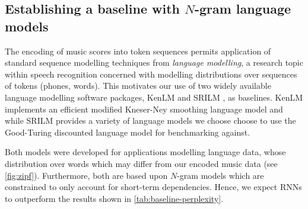 \subsection{Establishing a baseline with $N$-gram language models}

The encoding of music scores into token sequences permits application of
standard sequence modelling techniques from \emph{language modelling}, a
research topic within speech recognition concerned with modelling distributions
over sequences of tokens (\eg phones, words). This motivates our use of two
widely available language modelling software packages, KenLM
\citep{Heafield-estimate} and SRILM \citep{stolcke2002srilm}, as baselines.
KenLM implements an efficient modified Kneser-Ney smoothing language model and
while SRILM provides a variety of language models we choose choose to use the
Good-Turing discounted language model for benchmarking against.

Both models were developed for applications modelling language data, whose distribution
over words which may differ from our encoded music data (see \vref{fig:zipf}).
Furthermore, both are based upon $N$-gram models which are constrained to only
account for short-term dependencies. Hence, we expect RNNs to outperform the
results shown in \vref{tab:baseline-perplexity}.

